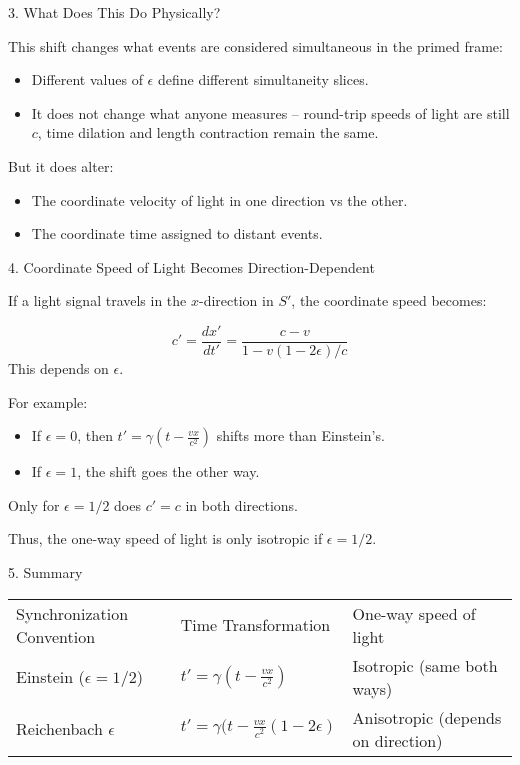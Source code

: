\documentclass[a4paper]{article}
\theoremstyle{plain}
\theoremstyle{definition}
\begin{document}
3. What Does This Do Physically?

This shift changes what events are considered simultaneous in the
primed frame:
\begin{itemize}
\item Different values of $\epsilon$ define different simultaneity
  slices.
\item It does not change what anyone measures -- round-trip speeds of
  light are still $c$, time dilation and length contraction remain the
  same.
\end{itemize}
But it does alter:
\begin{itemize}
\item The coordinate velocity of light in one direction vs the other.
\item The coordinate time assigned to distant events.
\end{itemize}

4. Coordinate Speed of Light Becomes Direction-Dependent

If a light signal travels in the $x$-direction in $S'$, the coordinate
speed becomes:

\begin{equation}
c' = \frac{dx'}{dt'} = \frac{c-v}{1 - v(1-2\epsilon)/c}
\end{equation}
This depends on $\epsilon$.

For example:
\begin{itemize}
\item If $\epsilon = 0$, then $t' = \gamma(t - \frac{vx}{c^2})$ shifts
  more than Einstein's.
\item If $\epsilon = 1$, the shift goes the other way.
\end{itemize}

Only for $\epsilon = 1/2$ does $c' = c$ in both directions.

Thus, the one-way speed of light is only isotropic if $\epsilon =
1/2$.

5. Summary

\begin{tabularx}{1.0\textwidth}{|p{3.4cm}|p{5cm}|p{5cm}|}
\cline{1-3} \\
Synchronization Convention & Time Transformation & One-way speed of light
\\ \cline{1-3}
Einstein ($\epsilon = 1/2$) & $t' = \gamma (t - \frac{vx}{c^2})$ & Isotropic (same both ways)
\\ \cline{1-3}
Reichenbach $\epsilon$ & $t' = \gamma (t - \frac{vx}{c^2} (1 - 2\epsilon)$ & Anisotropic (depends on direction)
\\ \cline{1-3}
\end{tabularx}
\end{document}
